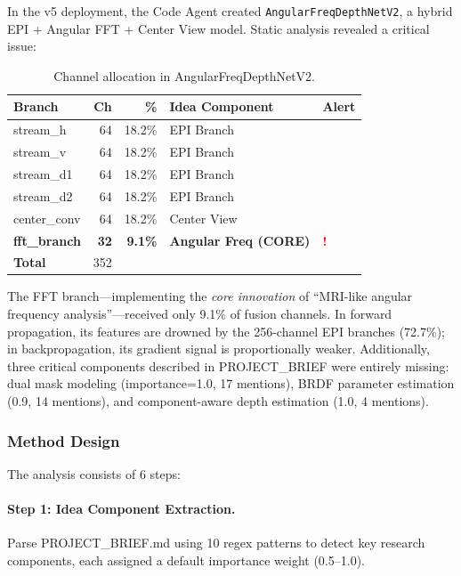 \documentclass[11pt,a4paper]{article}
\newcommand{\toolname}[1]{\texttt{#1}}
\begin{document}
In the v5 deployment, the Code Agent created \toolname{AngularFreqDepthNetV2}, a hybrid EPI + Angular FFT + Center View model.
Static analysis revealed a critical issue:

\begin{table}[h]
\centering
\caption{Channel allocation in AngularFreqDepthNetV2.}
\begin{tabular}{l r r l l}
\toprule
\textbf{Branch} & \textbf{Ch} & \textbf{\%} & \textbf{Idea Component} & \textbf{Alert} \\
\midrule
stream\_h  & 64 & 18.2\% & EPI Branch & \\
stream\_v  & 64 & 18.2\% & EPI Branch & \\
stream\_d1 & 64 & 18.2\% & EPI Branch & \\
stream\_d2 & 64 & 18.2\% & EPI Branch & \\
center\_conv & 64 & 18.2\% & Center View & \\
\textbf{fft\_branch} & \textbf{32} & \textbf{9.1\%} & \textbf{Angular Freq (CORE)} & \textcolor{red}{\textbf{!}} \\
\midrule
\textbf{Total} & 352 & & & \\
\bottomrule
\end{tabular}
\end{table}

\noindent The FFT branch---implementing the \emph{core innovation} of ``MRI-like angular frequency analysis''---received only 9.1\% of fusion channels.
In forward propagation, its features are drowned by the 256-channel EPI branches (72.7\%); in backpropagation, its gradient signal is proportionally weaker.
Additionally, three critical components described in PROJECT\_BRIEF were entirely missing:
dual mask modeling (importance=1.0, 17 mentions), BRDF parameter estimation (0.9, 14 mentions), and component-aware depth estimation (1.0, 4 mentions).

\subsubsection{Method Design}

The analysis consists of 6 steps:

\paragraph{Step 1: Idea Component Extraction.}
Parse PROJECT\_BRIEF.md using 10 regex patterns to detect key research components, each assigned a default importance weight (0.5--1.0).
\end{document}

